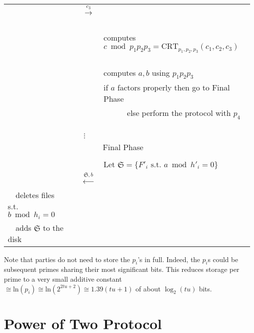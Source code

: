 \documentclass[11pt]{llncs}
\begin{document}
\begin{center}
\begin{tabular}{lcl}
                                   &~~{{\LARGE $\stackrel{c_3}{\longrightarrow}$}}~~      &   \\
                                   &                                                      &computes $c \bmod p_1 p_2 p_3=\mbox{CRT}_{p_1,p_2,p_3}(c_1,c_2,c_3)$~~\\
                                   &                                                      &computes $a,b$ using $p_1 p_2 p_3$~\\
                                   &                                                      &if $a$ factors properly then go to {\sf Final Phase}\\
                                   &                                                      &~~~~~~else perform the protocol with $p_4$ ~~\\
                                   &                  $\vdots$
& \\\midrule
\multicolumn{3}{c}{{\sf Final Phase~~}} \\\midrule
                                   &                                                      & \\
                                   &                                                      &Let $\mathfrak{S}=\{F'_i \mbox{~s.t.~} a \bmod h'_i =0\}$~~\\
                                   &~~{\LARGE $\stackrel{\mathfrak{S},b}{\longleftarrow}$}&\\
                                   ~~deletes files s.t. $b \bmod h_i =0$&                                                      &\\
                                   ~~adds $\mathfrak{S}$ to the disk
                                   &
                                   &\\\bottomrule
\end{tabular}
\end{center}

Note that parties do not need to store the $p_i$'s in full. Indeed, the $p_i$s could be subsequent primes sharing their most significant bits. This reduces storage per prime to a very small additive constant $ \cong \mbox{ln}(p_i) \cong \mbox{ln}(2^{2tu+2}) \cong 1.39(tu+1)$ of about $\log_2(tu)$ bits.

\section{Power of Two Protocol}
\label{powtwo}
\end{document}
